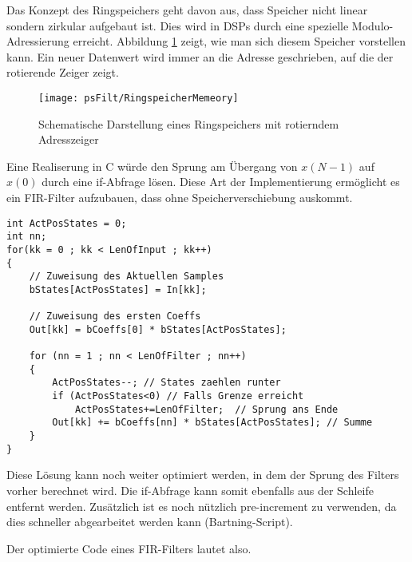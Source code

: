 Das Konzept des Ringspeichers geht davon aus, dass Speicher nicht linear sondern zirkular
aufgebaut ist. Dies wird in DSPs durch eine spezielle Modulo-Adressierung erreicht.
Abbildung \ref{pic:ZirkularMemeory} zeigt, wie man sich diesem Speicher vorstellen kann.
Ein neuer Datenwert wird immer an die Adresse geschrieben, auf die der rotierende Zeiger zeigt.

\begin{figure}[H]
\begin{center}
\texttt{[image: psFilt/RingspeicherMemeory]}
\caption{\label{pic:ZirkularMemeory} Schematische Darstellung eines Ringspeichers mit rotierndem
Adresszeiger}
\end{center}
\end{figure}

Eine Realiserung in C würde den Sprung am Übergang von $x(N-1)$
auf $x(0)$ durch eine if-Abfrage lösen. Diese Art der
Implementierung ermöglicht es ein FIR-Filter aufzubauen, dass ohne
Speicherverschiebung auskommt.

\begin{verbatim}
int ActPosStates = 0;
int nn;
for(kk = 0 ; kk < LenOfInput ; kk++)
{
    // Zuweisung des Aktuellen Samples
    bStates[ActPosStates] = In[kk];

    // Zuweisung des ersten Coeffs
    Out[kk] = bCoeffs[0] * bStates[ActPosStates];

    for (nn = 1 ; nn < LenOfFilter ; nn++)
    {
        ActPosStates--; // States zaehlen runter
        if (ActPosStates<0) // Falls Grenze erreicht
            ActPosStates+=LenOfFilter;  // Sprung ans Ende
        Out[kk] += bCoeffs[nn] * bStates[ActPosStates]; // Summe
    }
}
\end{verbatim}

Diese Lösung kann noch weiter optimiert werden, in dem der Sprung des Filters vorher berechnet wird.
Die if-Abfrage kann somit ebenfalls aus der Schleife entfernt werden. Zusätzlich ist es noch nützlich
pre-increment zu verwenden, da dies schneller abgearbeitet werden kann (Bartning-Script).

Der optimierte Code eines FIR-Filters lautet also.

